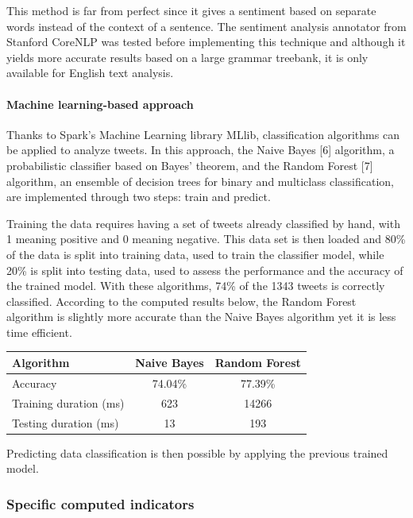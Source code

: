 \documentclass[11pt]{article}
\begin{document}
\vspace{9pt}
This method is far from perfect since it gives a sentiment based on separate words instead of the context of a sentence. The sentiment analysis annotator from \textsf{Stanford CoreNLP} was tested before implementing this technique and although it yields more accurate results based on a large grammar treebank, it is only available for English text analysis.

\paragraph{Machine learning-based approach}

Thanks to \textsf{Spark}'s Machine Learning library \textsf{MLlib}, classification algorithms can be applied to analyze tweets. In this approach, the Naive Bayes [6] algorithm, a probabilistic classifier based on Bayes' theorem, and the Random Forest [7] algorithm, an ensemble of decision trees for binary and multiclass classification, are implemented through two steps: train and predict.

\vspace{9pt}
Training the data requires having a set of tweets already classified by hand, with 1 meaning positive and 0 meaning negative. This data set is then loaded and 80\% of the data is split into training data, used to train the classifier model, while 20\% is split into testing data, used to assess the performance and the accuracy of the trained model.
With these algorithms, 74\% of the 1343 tweets is correctly classified. According to the computed results below, the Random Forest algorithm is slightly more accurate than the Naive Bayes algorithm yet it is less time efficient. %

\begin{center}
\begin{tabular}{|l|c|c|}
  \hline
  Algorithm & Naive Bayes & Random Forest \\
  \hline
  Accuracy & 74.04\% & 77.39\% \\ \hline
  Training duration (ms) & 623 & 14266 \\ \hline
  Testing duration (ms) & 13 & 193 \\
  \hline
\end{tabular}
\end{center}

Predicting data classification is then possible by applying the previous trained model.

\subsubsection{Specific computed indicators}
\end{document}

